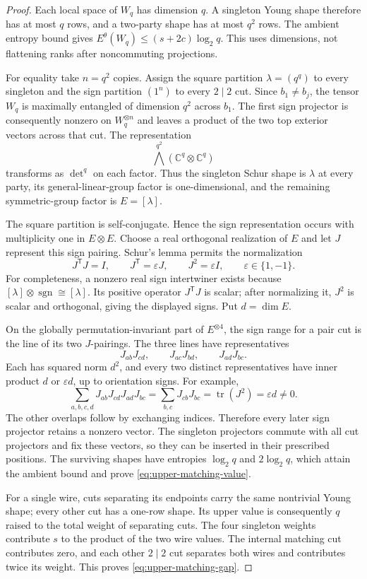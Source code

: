\begin{proof}
Each local space of $W_q$ has dimension $q$. A singleton Young
shape therefore has at most $q$ rows, and a two-party shape
has at most $q^2$ rows. The ambient entropy bound gives
$E^\theta(W_q)\le(s+2c)\log_2q$. This uses dimensions, not
flattening ranks after noncommuting projections.

For equality take $n=q^2$ copies. Assign the square partition
$\lambda=(q^q)$ to every singleton and the sign partition
$(1^n)$ to every $2\mid2$ cut. Since $b_1\ne b_j$, the tensor
$W_q$ is maximally entangled of dimension $q^2$ across $b_1$.
The first sign projector is consequently nonzero on $W_q^{\otimes n}$
and leaves a product of the two top exterior vectors across that cut.
The representation
\[
 \bigwedge^{q^2}(\mathbb C^q\otimes\mathbb C^q)
\]
transforms as $\det^q$ on each factor. Thus the singleton Schur
shape is $\lambda$ at every party, its general-linear-group
factor is one-dimensional, and the remaining symmetric-group
factor is $E=[\lambda]$.

The square partition is self-conjugate. Hence the sign
representation occurs with multiplicity one in $E\otimes E$.
Choose a real orthogonal realization of $E$ and let $J$ represent
this sign pairing. Schur's lemma permits the normalization
\[
 J^{\mathsf T}J=I,\qquad J^{\mathsf T}=\varepsilon J,
 \qquad J^2=\varepsilon I,\qquad \varepsilon\in\{1,-1\}.
\]
For completeness, a nonzero real sign intertwiner exists because
$[\lambda]\otimes\operatorname{sgn}\cong[\lambda]$.
Its positive operator $J^{\mathsf T}J$ is scalar; after normalizing
it, $J^2$ is scalar and orthogonal, giving the displayed signs.
Put $d=\dim E$.

On the globally permutation-invariant part of $E^{\otimes4}$,
the sign range for a pair cut is the line of its two $J$-pairings.
The three lines have representatives
\[
 J_{ab}J_{cd},\qquad J_{ac}J_{bd},\qquad J_{ad}J_{bc}.
\]
Each has squared norm $d^2$, and every two distinct representatives
have inner product $d$ or $\varepsilon d$, up to orientation signs.
For example,
\[
 \sum_{a,b,c,d}J_{ab}J_{cd}J_{ad}J_{bc}
   =\sum_{b,c}J_{cb}J_{bc}=\operatorname{tr}(J^2)
   =\varepsilon d\ne0.
\]
The other overlaps follow by exchanging indices. Therefore every
later sign projector retains a nonzero vector. The singleton
projectors commute with all cut projectors and fix these vectors,
so they can be inserted in their prescribed positions. The
surviving shapes have entropies $\log_2q$ and $2\log_2q$,
which attain the ambient bound and prove
\eqref{eq:upper-matching-value}.

For a single wire, cuts separating its endpoints carry the same
nontrivial Young shape; every other cut has a one-row shape.
Its upper value is consequently $q$ raised to the total weight
of separating cuts. The four singleton weights contribute $s$
to the product of the two wire values. The internal matching cut
contributes zero, and each other $2\mid2$ cut separates both
wires and contributes twice its weight. This proves
\eqref{eq:upper-matching-gap}.
\end{proof}

